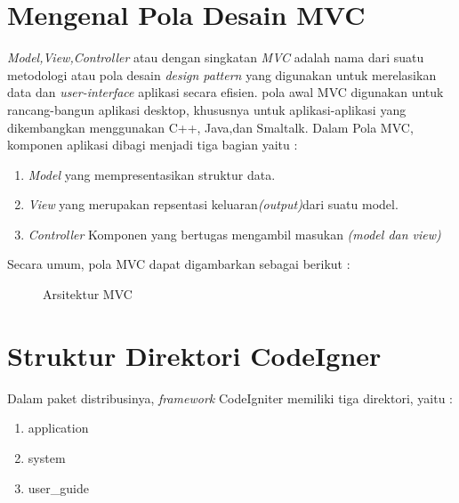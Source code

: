 \section {Mengenal Pola Desain MVC}
\textit{Model,View,Controller} atau dengan singkatan \textit {MVC} adalah nama dari suatu metodologi atau pola desain \textit {design pattern} yang digunakan untuk merelasikan data dan \textit{user-interface} aplikasi secara efisien. pola awal MVC digunakan untuk rancang-bangun aplikasi desktop, khususnya untuk aplikasi-aplikasi yang dikembangkan menggunakan C++, Java,dan Smaltalk.
Dalam Pola MVC, komponen aplikasi dibagi menjadi tiga bagian yaitu :
\begin{enumerate}
\item \textit{Model} yang mempresentasikan struktur data.
\item \textit{View} yang merupakan repsentasi keluaran\textit{(output)}dari suatu model.
\item \textit{Controller} Komponen yang bertugas mengambil masukan \textit{(model dan view)}
\end{enumerate}
Secara umum, pola MVC dapat digambarkan sebagai berikut :
\begin{figure}[ht]
\caption{Arsitektur MVC}
\label{Gambar 2}
\end{figure}

\section{Struktur Direktori CodeIgner}
Dalam paket distribusinya, \textit{framework} CodeIgniter memiliki tiga direktori, yaitu :
\begin{enumerate}
\item application
\item system
\item user\_guide
\end{enumerate}

